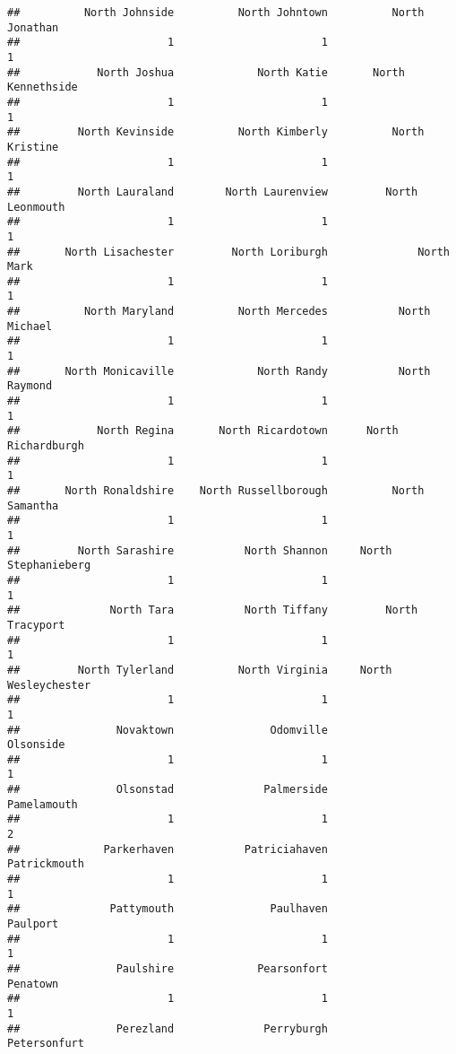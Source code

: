 \documentclass[
]{article}
\begin{document}
\begin{verbatim}
##          North Johnside          North Johntown          North Jonathan 
##                       1                       1                       1 
##            North Joshua             North Katie       North Kennethside 
##                       1                       1                       1 
##         North Kevinside          North Kimberly          North Kristine 
##                       1                       1                       1 
##         North Lauraland        North Laurenview         North Leonmouth 
##                       1                       1                       1 
##       North Lisachester         North Loriburgh              North Mark 
##                       1                       1                       1 
##          North Maryland          North Mercedes           North Michael 
##                       1                       1                       1 
##       North Monicaville             North Randy           North Raymond 
##                       1                       1                       1 
##            North Regina       North Ricardotown      North Richardburgh 
##                       1                       1                       1 
##       North Ronaldshire    North Russellborough          North Samantha 
##                       1                       1                       1 
##         North Sarashire           North Shannon     North Stephanieberg 
##                       1                       1                       1 
##              North Tara           North Tiffany         North Tracyport 
##                       1                       1                       1 
##         North Tylerland          North Virginia     North Wesleychester 
##                       1                       1                       1 
##               Novaktown               Odomville               Olsonside 
##                       1                       1                       1 
##               Olsonstad              Palmerside             Pamelamouth 
##                       1                       1                       2 
##             Parkerhaven           Patriciahaven            Patrickmouth 
##                       1                       1                       1 
##              Pattymouth               Paulhaven                Paulport 
##                       1                       1                       1 
##               Paulshire             Pearsonfort                Penatown 
##                       1                       1                       1 
##               Perezland              Perryburgh            Petersonfurt 

\end{verbatim}
\end{document}
